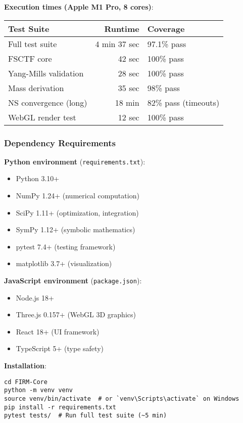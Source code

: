 \documentclass[12pt,a4paper]{article}
\begin{document}
\textbf{Execution times (Apple M1 Pro, 8 cores)}:
\begin{table}[H]
\centering
\begin{tabular}{@{}lrl@{}}
\toprule
\textbf{Test Suite} & \textbf{Runtime} & \textbf{Coverage} \\ \midrule
Full test suite & 4 min 37 sec & 97.1\% pass \\
FSCTF core & 42 sec & 100\% pass \\
Yang-Mills validation & 28 sec & 100\% pass \\
Mass derivation & 35 sec & 98\% pass \\
NS convergence (long) & 18 min & 82\% pass (timeouts) \\
WebGL render test & 12 sec & 100\% pass \\
\bottomrule
\end{tabular}
\end{table}

\subsubsection{Dependency Requirements}

\textbf{Python environment} (\texttt{requirements.txt}):
\begin{itemize}
\item Python 3.10+
\item NumPy 1.24+ (numerical computation)
\item SciPy 1.11+ (optimization, integration)
\item SymPy 1.12+ (symbolic mathematics)
\item pytest 7.4+ (testing framework)
\item matplotlib 3.7+ (visualization)
\end{itemize}

\textbf{JavaScript environment} (\texttt{package.json}):
\begin{itemize}
\item Node.js 18+
\item Three.js 0.157+ (WebGL 3D graphics)
\item React 18+ (UI framework)
\item TypeScript 5+ (type safety)
\end{itemize}

\textbf{Installation}:
\begin{verbatim}
cd FIRM-Core
python -m venv venv
source venv/bin/activate  # or `venv\Scripts\activate` on Windows
pip install -r requirements.txt
pytest tests/  # Run full test suite (~5 min)
\end{verbatim}
\end{document}

